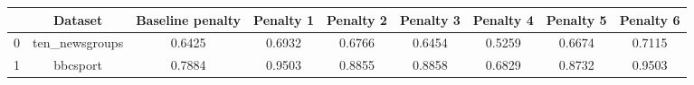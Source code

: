 \begin{tabular}{|l|c|c|c|c|c|c|c|c|}
\hline
 & Dataset & Baseline penalty & Penalty 1 & Penalty 2 & Penalty 3 & Penalty 4 & Penalty 5 & Penalty 6 \\
\hline
0 & ten_newsgroups & 0.6425 & 0.6932 & 0.6766 & 0.6454 & 0.5259 & 0.6674 & 0.7115 \\
1 & bbcsport & 0.7884 & 0.9503 & 0.8855 & 0.8858 & 0.6829 & 0.8732 & 0.9503 \\
\hline
\end{tabular}
